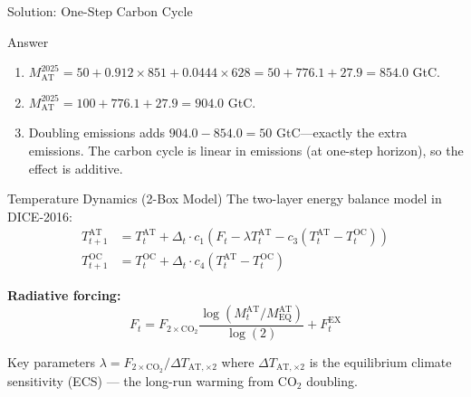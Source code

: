 \documentclass[aspectratio=169,11pt]{beamer}
\newcommand{\emphc}[1]{\textcolor{harvardcrimson}{#1}}
\begin{document}
\begin{frame}{Solution: One-Step Carbon Cycle}
\begin{block}{Answer}
\begin{enumerate}
    \item $M_{\text{AT}}^{2025} = 50 + 0.912 \times 851 + 0.0444 \times 628 = 50 + 776.1 + 27.9 = 854.0$ GtC.
    \item $M_{\text{AT}}^{2025} = 100 + 776.1 + 27.9 = 904.0$ GtC.
    \item Doubling emissions adds $904.0 - 854.0 = 50$ GtC---exactly the extra emissions.  The carbon cycle is \emphc{linear} in emissions (at one-step horizon), so the effect is additive.
\end{enumerate}
\end{block}
\end{frame}

\begin{frame}{Temperature Dynamics (2-Box Model)}
\small
The two-layer energy balance model in DICE-2016:
\begin{align*}
    T^{\mathrm{AT}}_{t+1} &= T^{\mathrm{AT}}_{t} + \Delta_t \cdot c_{1} \left(F_{t} - \lambda T^{\mathrm{AT}}_{t} - c_{3}\left(T^{\mathrm{AT}}_{t} - T^{\mathrm{OC}}_{t}\right)\right) \\
    T^{\mathrm{OC}}_{t+1} &= T^{\mathrm{OC}}_{t} + \Delta_t \cdot c_{4} \left(T^{\mathrm{AT}}_{t} - T^{\mathrm{OC}}_{t}\right)
\end{align*}

\textbf{Radiative forcing:}
\[
    F_{t} = F_{\mathrm{2\times CO_2}} \frac{\log(M^{\mathrm{AT}}_{t}/M^{\mathrm{AT}}_{\mathrm{EQ}})}{\log(2)} + F^{\mathrm{EX}}_{t}
\]

\begin{alertblock}{Key parameters}
$\lambda = F_{\mathrm{2\times CO_2}}/\Delta T_{\mathrm{AT},\times 2}$ where $\Delta T_{\mathrm{AT},\times 2}$ is the \emphc{equilibrium climate sensitivity} (ECS) --- the long-run warming from CO$_2$ doubling.
\end{alertblock}
\end{frame}
\end{document}
